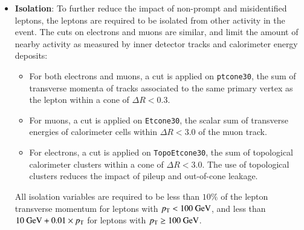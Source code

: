 \begin{itemize}
	\item \textbf{Isolation}: To further reduce the impact of non-prompt and misidentified leptons, the leptons are required to be isolated from other activity in the event. The cuts on electrons and muons are similar, and limit the amount of nearby activity as measured by inner detector tracks and calorimeter energy deposits:

	\begin{itemize}
		\item For both electrons and muons, a cut is applied on \verb.ptcone30., the sum of transverse momenta of tracks associated to the same primary vertex as the lepton within a cone of $\Delta R<0.3$. 
		\item For muons, a cut is applied on \verb.Etcone30., the scalar sum of transverse energies of calorimeter cells within $\Delta R<3.0$ of the muon track. 
		\item For electrons, a cut is applied on \verb.TopoEtcone30., the sum of topological calorimeter clusters within a cone of $\Delta R < 3.0$. The use of topological clusters reduces the impact of pileup and out-of-cone leakage. 
	\end{itemize}

	All isolation variables are required to be less than $10\%$ of the lepton transverse momentum for leptons with $p_{\text{T}}<100~\mbox{GeV}$, and less than $10~\mbox{GeV}+0.01\times p_{\text{T}}$ for leptons with $p_{\text{T}}\geq 100~\mbox{GeV}$. 
\end{itemize}

